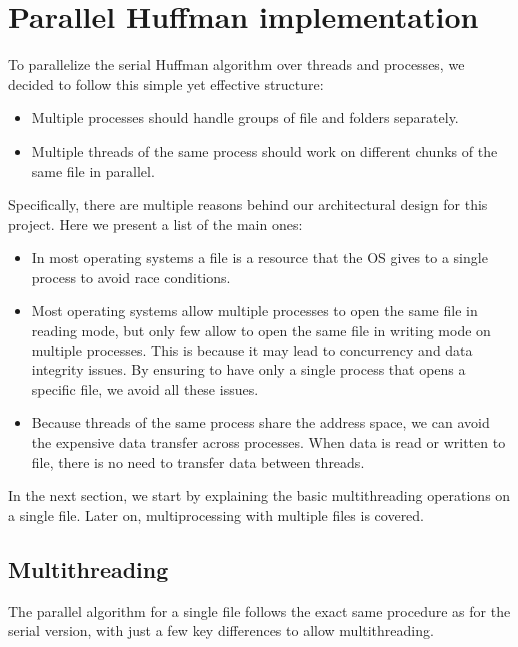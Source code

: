 \section{Parallel Huffman implementation}
To parallelize the serial Huffman algorithm over threads and processes, we decided to follow this simple yet effective structure:
\begin{itemize}
    \item Multiple processes should handle groups of file and folders separately.
    \item Multiple threads of the same process should work on different chunks of the same file in parallel.
\end{itemize}
Specifically, there are multiple reasons behind our architectural design for this project. Here we present a list of the main ones:
\begin{itemize}
	\item In most operating systems a file is a resource that the OS gives to a single process to avoid race conditions.
	\item Most operating systems allow multiple processes to open the same file in reading mode, but only few allow to open the same file in writing mode on multiple processes. This is because it may lead to concurrency and data integrity issues. By ensuring to have only a single process that opens a specific file, we avoid all these issues.
	\item Because threads of the same process share the address space, we can avoid the expensive data transfer across processes. When data is read or written to file, there is no need to transfer data between threads.
\end{itemize}
In the next section, we start by explaining the basic multithreading operations on a single file. Later on, multiprocessing with multiple files is covered.

\subsection{Multithreading}
The parallel algorithm for a single file follows the exact same procedure as for the serial version, with just a few key differences to allow multithreading. 

